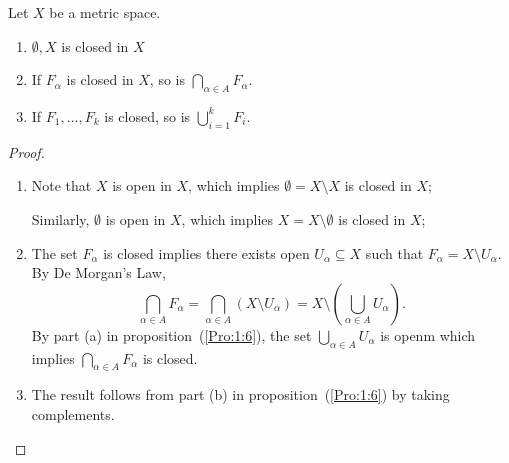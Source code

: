 \begin{proposition}
Let $X$ be a metric space.
\begin{enumerate}
\item
$\emptyset,X$ is closed in $X$
\item
If $F_\alpha$ is closed in $X$, so is $\bigcap_{\alpha\in A}F_\alpha$.
\item
If $F_1,\dots,F_k$ is closed, so is $\bigcup_{i=1}^kF_i$.
\end{enumerate}
\end{proposition}
\begin{proof}
\begin{enumerate}
\item
Note that $X$ is open in $X$, which implies $\emptyset=X\setminus X$ is closed in $X$;

Similarly, $\emptyset$ is open in $X$, which implies $X=X\setminus \emptyset$ is closed in $X$;
\item
The set $F_\alpha$ is closed implies there exists open $U_\alpha\subseteq X$ such that $F_\alpha=X\setminus U_\alpha$. By De Morgan's Law,
\[
\bigcap_{\alpha\in A}F_\alpha=\bigcap_{\alpha\in A}(X\setminus U_\alpha)=X\setminus(\bigcup_{\alpha\in A}U_\alpha).
\]
By part (a) in proposition~(\ref{Pro:1:6}), the set $\bigcup_{\alpha\in A}U_\alpha$ is openm which implies $\bigcap_{\alpha\in A}F_\alpha$ is closed.
\item
The result follows from part (b) in proposition~(\ref{Pro:1:6}) by taking complements.
\end{enumerate}

\end{proof}

